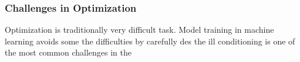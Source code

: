 \subsubsection{Challenges in Optimization}

Optimization is traditionally very difficult task. Model training in machine learning avoids some the difficulties by carefully des
the ill conditioning is one of the most common challenges in the 